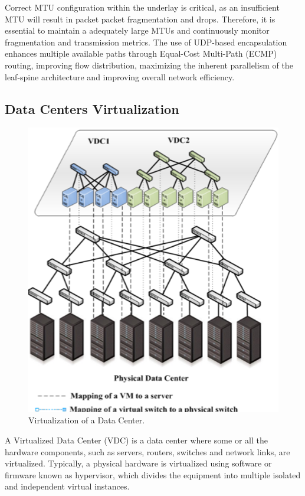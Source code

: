 Correct MTU configuration within the underlay is critical, as an insufficient MTU will result in packet packet fragmentation and drops. Therefore, it is essential to maintain a adequately large MTUs and continuously monitor fragmentation and transmission metrics. The use of UDP-based encapsulation enhances multiple available paths through Equal-Cost Multi-Path (ECMP) routing, improving flow distribution, maximizing the inherent parallelism of the leaf-spine architecture and improving overall network efficiency. \par

\subsection{Data Centers Virtualization}

\begin{figure}
    \centering
    \includegraphics[width=0.8\linewidth]{Figures/virtualization.png}
    \caption{Virtualization of a Data Center.}
    \label{virtualization}
\end{figure}

A Virtualized Data Center (VDC) is a data center where some or all the hardware components, such as servers, routers, switches and network links, are virtualized. Typically, a physical hardware is virtualized using software or firmware known as hypervisor, which divides the equipment into multiple isolated and independent virtual instances. 

